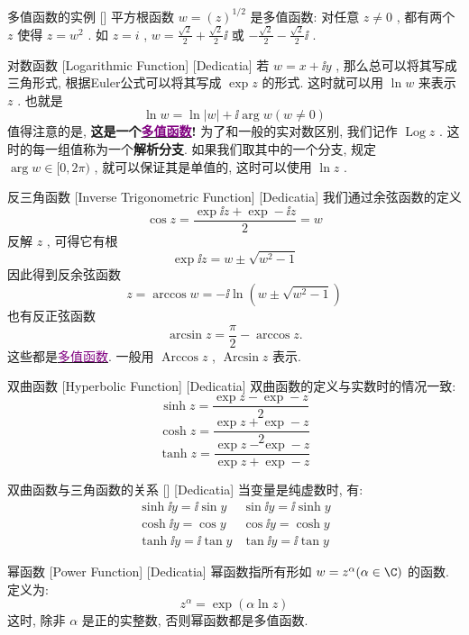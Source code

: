 \documentclass[UTF8]{ctexart}
\newcommand{\hyperrefc}[2]{\hyperref[#1]{\textcolor{purple}{#2}}}
\DeclareMathOperator{\Log}{Log}
\begin{document}
\begin{xmp}
    {多值函数的实例}
    []
    平方根函数 \( w=(z)^{1/2} \) 是多值函数: 对任意 \( z\neq 0 \) , 都有两个 \( z \) 使得 \( z=w^2 \) . 如 \( z=i \) ,  \( w=\frac{\sqrt{2}}{2}+\frac{\sqrt{2}}{2}\ii \) 或 \( -\frac{\sqrt{2}}{2}-\frac{\sqrt{2}}{2}\ii \) .
\end{xmp}
\begin{dfn}
    [Logarithmic]
    {对数函数}
    [Logarithmic Function]
    [Dedicatia]
    若 \( w=x+\ii y \) , 那么总可以将其写成三角形式, 根据Euler公式可以将其写成 \( \exp z \) 的形式. 这时就可以用 \( \ln w \) 来表示 \( z \) . 也就是
    \[\ln w=\ln|w|+\ii\arg w (w\neq 0)\]
    值得注意的是, \textbf{这是一个\hyperrefc{dfn:Multivalued}{多值函数}! }为了和一般的实对数区别, 我们记作 \( \Log z \) . 这时的每一组值称为一个\textbf{解析分支}. 如果我们取其中的一个分支, 规定 \( \arg w\in[0,2\pi) \) , 就可以保证其是单值的, 这时可以使用 \( \ln z \) .
\end{dfn}
\begin{dfn}
    [InverseTriangular]
    {反三角函数}
    [Inverse Trigonometric Function]
    [Dedicatia]
    我们通过余弦函数的定义
    \[\cos z=\frac{\exp\ii z+\exp -\ii z}{2}=w\]
    反解 \( z \) , 可得它有根
    \[\exp\ii z=w\pm\sqrt{w^2-1}\]
    因此得到反余弦函数
    \[z=\arccos w=-\ii\ln(w\pm\sqrt{w^2-1})\]
    也有反正弦函数
    \[\arcsin z=\frac{\pi}{2}-\arccos z.\]
    这些都是\hyperrefc{dfn:Multivalued}{多值函数}. 一般用 \( \operatorname{Arccos}z \) ,  \( \operatorname{Arcsin}z \) 表示. \\
\end{dfn}
\begin{dfn}
    [HyperbolicFunction]
    {双曲函数}
    [Hyperbolic Function]
    [Dedicatia]
    双曲函数的定义与实数时的情况一致: 
    \[\sinh z=\frac{\exp z-\exp -z}{2}\]
    \[\cosh z=\frac{\exp z+\exp -z}{2}\]
    \[\tanh z=\frac{\exp z-\exp -z}{\exp z+\exp -z}\]
\end{dfn}
\begin{ppt}
    [UUID]
    {双曲函数与三角函数的关系}
    []
    [Dedicatia]
    当变量是纯虚数时, 有: 
    \[\begin{array}{cc}
        \sinh\ii y=\ii\sin y&\sin\ii y=\ii\sinh y\\
        \cosh\ii y=\cos y&\cos\ii y=\cosh y\\
        \tanh\ii y=\ii\tan y&\tan\ii y=\ii\tan y
    \end{array}\]
\end{ppt}
\begin{dfn}
    [UUID]
    {幂函数}
    [Power Function]
    [Dedicatia]
    幂函数指所有形如 \( w=z^\alpha (\alpha\in\C) \) 的函数. 定义为: 
    \[z^\alpha = \exp(\alpha \ln z)\]
    这时, 除非 \( \alpha \) 是正的实整数, 否则幂函数都是多值函数. 
\end{dfn}
\end{document}
